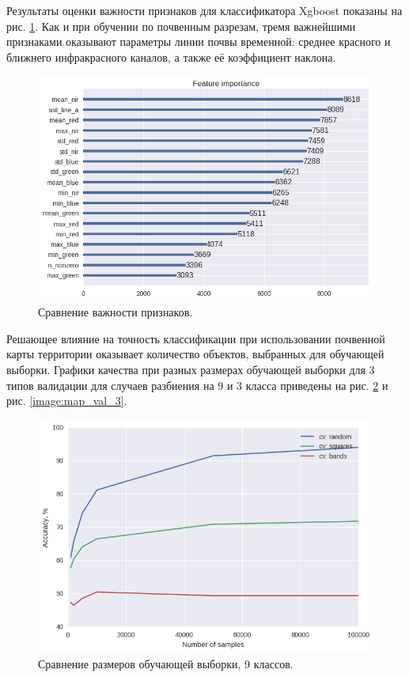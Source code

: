 \documentclass[14pt]{extarticle}
\begin{document}
\par
Результаты оценки важности признаков для классификатора Xgboost показаны на рис. 
\ref{image:map_importance}. Как и при обучении по почвенным разрезам, тремя важнейшими
признаками оказывают параметры линии почвы временной: среднее красного и ближнего инфракрасного
каналов, а также её коэффициент наклона.
\begin{figure}[H]
\centering
\includegraphics[width=\linewidth]{imgs/map_importance.png}
\caption{Сравнение важности признаков.}
\label{image:map_importance}
\end{figure}
\par
Решающее влияние на точность классификации при использовании почвенной карты территории оказывает
количество объектов, выбранных для обучающей выборки. Графики качества при разных
размерах обучающей выборки для 3 типов валидации для случаев разбиения на 9 и 3 класса
приведены на рис. \ref{image:map_val_9} и рис. \ref{image:map_val_3}.
\begin{figure}[H]
\centering
\includegraphics[width=\linewidth]{imgs/map_validations_9_classes.png}
\caption{Сравнение размеров обучающей выборки, 9 классов.}
\label{image:map_val_9}
\end{figure}
\end{document}
